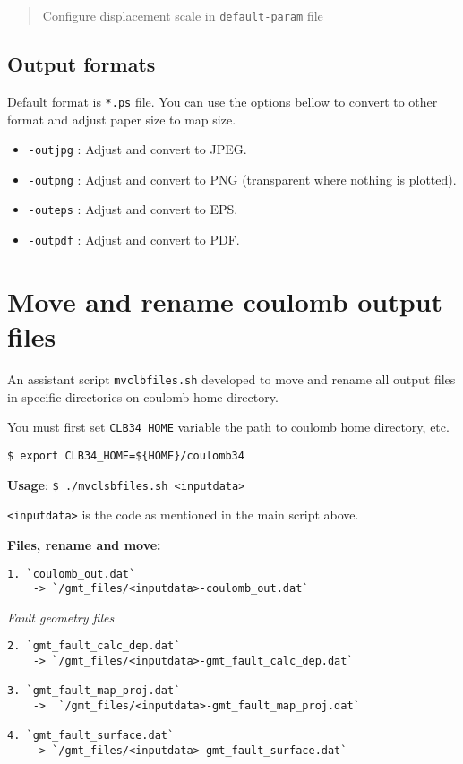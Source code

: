 \begin{quote}
Configure displacement scale in \texttt{default-param} file
\end{quote}

\subsection{Output formats}\label{output-formats}

Default format is \texttt{*.ps} file. You can use the options bellow to
convert to other format and adjust paper size to map size.

\begin{itemize}
\item
  \texttt{-outjpg} : Adjust and convert to JPEG.
\item
  \texttt{-outpng} : Adjust and convert to PNG (transparent where
  nothing is plotted).
\item
  \texttt{-outeps} : Adjust and convert to EPS.
\item
  \texttt{-outpdf} : Adjust and convert to PDF.
\end{itemize}

\section{Move and rename coulomb output
files}\label{move-and-rename-coulomb-output-files}

An assistant script \texttt{mvclbfiles.sh} developed to move and rename
all output files in specific directories on coulomb home directory.

You must first set \texttt{CLB34\_HOME} variable the path to coulomb
home directory, etc.

\texttt{\$\ export\ CLB34\_HOME=\$\{HOME\}/coulomb34}

\textbf{Usage}:
\texttt{\$\ ./mvclsbfiles.sh\ \textless{}inputdata\textgreater{}}

\texttt{\textless{}inputdata\textgreater{}} is the code as mentioned in
the main script above.

\textbf{Files, rename and move:}

\begin{verbatim}
1. `coulomb_out.dat`  
    -> `/gmt_files/<inputdata>-coulomb_out.dat`
\end{verbatim}

\emph{Fault geometry files}

\begin{verbatim}
2. `gmt_fault_calc_dep.dat` 
    -> `/gmt_files/<inputdata>-gmt_fault_calc_dep.dat`

3. `gmt_fault_map_proj.dat` 
    ->  `/gmt_files/<inputdata>-gmt_fault_map_proj.dat`

4. `gmt_fault_surface.dat`  
    -> `/gmt_files/<inputdata>-gmt_fault_surface.dat`
\end{verbatim}

